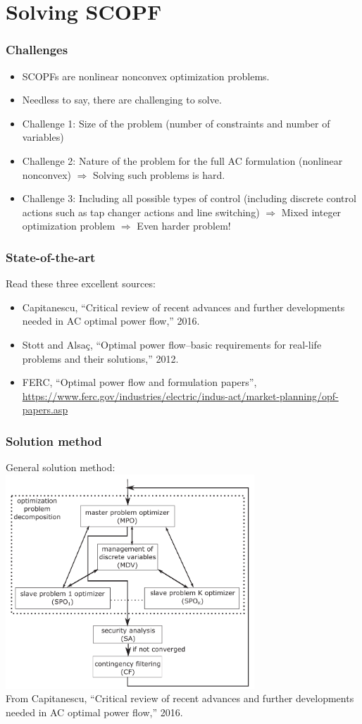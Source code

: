 \documentclass[compress]{beamer}
\begin{document}
\section{Solving SCOPF}


\begin{frame}
  \frametitle{Challenges}
  \begin{itemize}
  \item SCOPFs are nonlinear nonconvex optimization problems.
  \item Needless to say, there are challenging to solve.
  \item Challenge 1: Size of the problem (number of constraints and number of variables)
  \item Challenge 2: Nature of the problem for the full AC formulation (nonlinear nonconvex) $\Rightarrow$ Solving such problems is hard.
  \item Challenge 3: Including all possible types of control (including discrete control actions such as tap changer actions and line switching) $\Rightarrow$ Mixed integer optimization problem $\Rightarrow$ Even harder problem!
  \end{itemize}
\end{frame}

\begin{frame}
  \frametitle{State-of-the-art}
Read these three excellent sources:
\begin{itemize}
\item Capitanescu, ``Critical review of recent advances and further developments needed in AC optimal power flow,'' 2016.
\item Stott and Alsaç, ``Optimal power flow–basic requirements for real-life problems and their solutions,'' 2012.
\item FERC, ``Optimal power flow and formulation papers'', \url{https://www.ferc.gov/industries/electric/indus-act/market-planning/opf-papers.asp}
\end{itemize}
\end{frame}

\begin{frame}
  \frametitle{Solution method}
General solution method:\\
\includegraphics[width=0.7\textwidth]{Figs/SCOPF_flowchart.png}\\
From Capitanescu, ``Critical review of recent advances and further developments needed in AC optimal power flow,'' 2016.
\end{frame}
\end{document}
